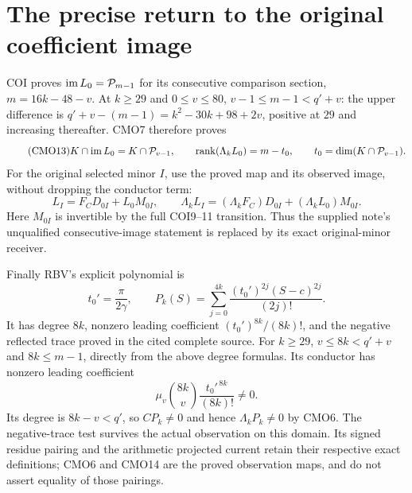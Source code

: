 \documentclass[11pt,a4paper]{article}
\begin{document}
\section{The precise return to the original coefficient image}
COI proves $\operatorname{im} L_0=\mathcal P_{m-1}$ for its consecutive
comparison section, $m=16k-48-v$. At $k\ge29$ and $0\le v\le80$,
$v-1\le m-1<q'+v$: the upper difference is
$q'+v-(m-1)=k^2-30k+98+2v$, positive at $29$
and increasing thereafter. CMO7 therefore proves
\begin{equation}\tag{CMO13}
 K\cap\operatorname{im} L_0=K\cap\mathcal P_{v-1},\qquad
 \operatorname{rank}(\Lambda_k L_0)=m-t_0,\qquad
 t_0=\dim(K\cap\mathcal P_{v-1}).
\end{equation}
For the original selected minor $I$, use the proved map
and its observed image, without dropping the conductor term:
\begin{equation}\tag{CMO14}
 \boxed{L_I=F_CD_{0I}+L_0M_{0I},\qquad
 \Lambda_kL_I=(\Lambda_kF_C)D_{0I}
                          +(\Lambda_kL_0)M_{0I}.}
\end{equation}
Here $M_{0I}$ is invertible by the full COI9--11 transition.
Thus the supplied note's unqualified consecutive-image statement
is replaced by its exact original-minor receiver.

Finally RBV's explicit polynomial \cite{a04cmo:RBV} is
\[
 t_0'=\frac{\pi}{2\gamma},\qquad
 P_k(S)=\sum_{j=0}^{4k}\frac{(t_0')^{2j}(S-c)^{2j}}{(2j)!}.
\]
It has degree $8k$, nonzero leading coefficient
$(t_0')^{8k}/(8k)!$, and the negative reflected trace proved
in the cited complete source. For $k\ge29$,
$v\le8k<q'+v$ and $8k\le m-1$, directly from the above
degree formulas. Its conductor has nonzero leading coefficient
\begin{equation}\tag{CMO15}
 \mu_v\binom{8k}{v}\frac{t_0'^{\,8k}}{(8k)!}\ne0 .
\end{equation}
Its degree is $8k-v<q'$, so $CP_k\ne0$ and hence
$\Lambda_kP_k\ne0$ by CMO6. The negative-trace test survives
the actual observation on this domain. Its signed residue
pairing and the arithmetic projected current retain their
respective exact definitions; CMO6 and CMO14 are the proved
observation maps, and do not assert equality of those pairings.



\endgroup

\endgroup
\end{document}
